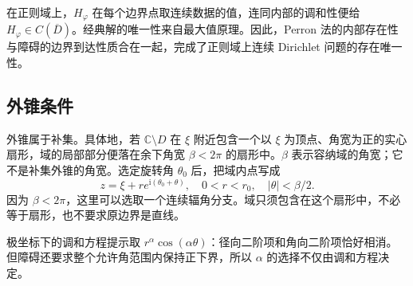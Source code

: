 \ProseParagraphBreak

在正则域上，\(H_\varphi\) 在每个边界点取连续数据的值，连同内部的调和性便给 \(H_\varphi\in C(\overline D)\)。经典解的唯一性来自最大值原理。因此，Perron 法的内部存在性与障碍的边界到达性质合在一起，完成了正则域上连续 Dirichlet 问题的存在唯一性。

\subsection{外锥条件}
\label{b3:subsec:160303}

外锥属于补集。具体地，若 \(\mathbb C\setminus D\) 在 \(\xi\) 附近包含一个以 \(\xi\) 为顶点、角宽为正的实心扇形，域的局部部分便落在余下角宽 \(\beta<2\pi\) 的扇形中。\(\beta\) 表示容纳域的角宽；它不是补集外锥的角宽。选定旋转角 \(\theta_0\) 后，把域内点写成
\[
 z=\xi+r e^{\mathrm{i}(\theta_0+\theta)},
 \quad 0<r<r_0,\quad |\theta|<\beta/2.
\]
因为 \(\beta<2\pi\)，这里可以选取一个连续辐角分支。域只须包含在这个扇形中，不必等于扇形，也不要求原边界是直线。

\ProseParagraphBreak

极坐标下的调和方程提示取 \(r^\alpha\cos(\alpha\theta)\)：径向二阶项和角向二阶项恰好相消。但障碍还要求整个允许角范围内保持正下界，所以 \(\alpha\) 的选择不仅由调和方程决定。

